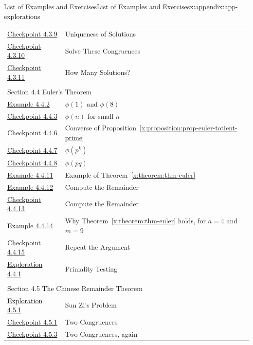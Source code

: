 \documentclass[oneside,10pt,]{book}
\newcommand{\xreffont}{\relax}
\numberwithin{equation}{section}
\begin{document}
\begin{appendixptx}{List of Examples and Exercises}{}{List of Examples and Exercises}{}{}{x:appendix:app-explorations}
\begin{longtable}[l]{ll}
\hyperref[x:exercise:ex-cong-rel-prime-unique]{Checkpoint 4.3.9}& Uniqueness of Solutions\\
\hyperref[x:exercise:ex-cong-solve-congruences]{Checkpoint 4.3.10}& Solve These Congruences\\
\hyperref[x:exercise:ex-cong-how-many-solutions]{Checkpoint 4.3.11}& How Many Solutions?\\
\multicolumn{2}{l}{\null}\\[1.5ex] \multicolumn{2}{l}{\large Section 4.4 Euler's Theorem}\\[0.5ex]
\hyperref[x:example:eg-cong-totient]{Example 4.4.2}& \(\phi(1)\) and \(\phi(8)\)\\
\hyperref[x:exercise:ex-cong-totient]{Checkpoint 4.4.3}& \(\phi(n)\) for small \(n\)\\
\hyperref[x:exercise:ex-cong-euler-totient-prime-converse]{Checkpoint 4.4.6}& Converse of Proposition~{\xreffont\ref*{x:proposition:prop-euler-totient-prime}}\\
\hyperref[x:exercise:ex-cong-euler-totient-prime-power]{Checkpoint 4.4.7}& \(\phi(p^k)\)\\
\hyperref[x:exercise:ex-cong-euler-totient-prime-product]{Checkpoint 4.4.8}& \(\phi(pq)\)\\
\hyperref[x:example:eg-cong-euler-apply]{Example 4.4.11}& Example of Theorem~{\xreffont\ref*{x:theorem:thm-euler}}\\
\hyperref[x:example:eg-cong-euler-remainder]{Example 4.4.12}& Compute the Remainder\\
\hyperref[x:exercise:ex-cong-euler-remainder]{Checkpoint 4.4.13}& Compute the Remainder\\
\hyperref[x:example:eg-cong-euler-proof-example]{Example 4.4.14}& Why Theorem~{\xreffont\ref*{x:theorem:thm-euler}} holds, for \(a = 4\) and \(m = 9\)\\
\hyperref[x:exercise:ex-cong-euler-proof-example-again]{Checkpoint 4.4.15}& Repeat the Argument\\
\hyperref[x:exploration:expl-primality-testing]{Exploration 4.4.1}& Primality Testing\\
\multicolumn{2}{l}{\null}\\[1.5ex] \multicolumn{2}{l}{\large Section 4.5 The Chinese Remainder Theorem}\\[0.5ex]
\hyperref[x:exploration:expl-sunzi]{Exploration 4.5.1}& Sun Zi's Problem\\
\hyperref[x:exercise:ex-crt-small]{Checkpoint 4.5.1}& Two Congruences\\
\hyperref[x:exercise:ex-crt-small-again]{Checkpoint 4.5.3}& Two Congruences, again\\

\end{longtable}
\end{appendixptx}
\end{document}
